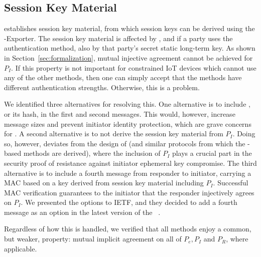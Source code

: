 \documentclass[runningheads]{llncs}
\begin{document}
\subsection{Session Key Material}
\label{sec:sessionKeyMaterial}
\mEdhoc{} establishes session key material, from which session keys
can be derived using the \mEdhoc{}-Exporter.
%
The session key material is affected by \mGxy{}, and if a party uses the
\mStat{} authentication method, also by that party's secret static long-term key.
%
As shown in Section~\ref{sec:formalization}, mutual injective agreement cannot
be achieved for $P_I$.
%
If this property is not important for constrained IoT devices which cannot use
any of the other methods, then one can simply accept that the methods have
different authentication strengths.
%
Otherwise, this is a problem.
%

We identified three alternatives for resolving this.
%
One alternative is to include \mIdcredi{}, or its hash, in the first and
second messages.
%
This would, however, increase message sizes and prevent initiator identity
protection, which are grave concerns for \mEdhoc{}.
%
A second alternative is to not derive the session key material from $P_I$.
%
Doing so, however, deviates from the design of \mOptls{} (and similar protocols
from which the \mStat{}-based methods are derived), where the inclusion of
$P_I$ plays a crucial part in the security proof of resistance against
initiator ephemeral key compromise.
%
The third alternative is to include a fourth message from responder to initiator,
carrying a MAC based on a key derived from session key material including $P_I$.
%
Successful MAC verification guarantees
to the initiator that the responder injectively agrees on $P_I$.
%
We presented the options to IETF, and they decided to add a
fourth message as an option in the latest version of the
\mSpec{}~\cite{latest-ietf-lake-edhoc-05}.
%

Regardless of how this is handled, we verified that all methods
enjoy a common, but weaker, property: mutual implicit agreement
on all of $P_e, P_I$ and $P_R$, where applicable.
%

\end{document}
